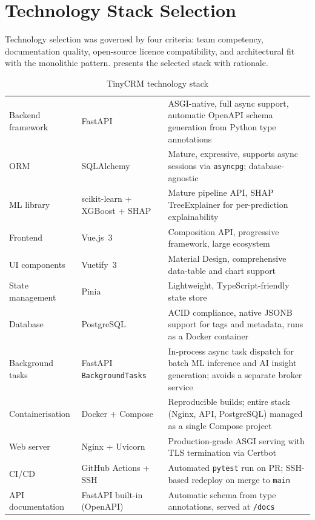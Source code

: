 \section{Technology Stack Selection}
 
Technology selection was governed by four criteria: team competency,
documentation quality, open-source licence compatibility, and architectural
fit with the monolithic pattern.  presents the selected
stack with rationale.
 
\begin{table}[H]
  \centering
  \caption{TinyCRM technology stack}
  \label{tab:techstack}
  \begin{tabularx}{\textwidth}{@{}L{2.8cm} L{2.6cm} X@{}}
    \toprule
     &  &  \\
    \midrule
    Backend framework & FastAPI &
      ASGI-native, full async support, automatic OpenAPI schema
      generation from Python type annotations \\
    ORM & SQLAlchemy &
      Mature, expressive, supports async sessions via \texttt{asyncpg};
      database-agnostic \\
    ML library & scikit-learn + XGBoost + SHAP &
      Mature pipeline API, SHAP TreeExplainer for per-prediction
      explainability \\
    Frontend & Vue.js~3 &
      Composition API, progressive framework, large ecosystem \\
    UI components & Vuetify~3 &
      Material Design, comprehensive data-table and chart support \\
    State management & Pinia &
      Lightweight, TypeScript-friendly state store \\
    Database & PostgreSQL &
      ACID compliance, native JSONB support for tags and metadata,
      runs as a Docker container \\
    Background tasks & FastAPI \texttt{BackgroundTasks} &
      In-process async task dispatch for batch ML inference and
      AI insight generation; avoids a separate broker service \\
    Containerisation & Docker + Compose &
      Reproducible builds; entire stack (Nginx, API, PostgreSQL)
      managed as a single Compose project \\
    Web server & Nginx + Uvicorn &
      Production-grade ASGI serving with TLS termination via Certbot \\
    CI/CD & GitHub Actions + SSH &
      Automated \texttt{pytest} run on PR; SSH-based redeploy on
      merge to \texttt{main} \\
    API documentation & FastAPI built-in (OpenAPI) &
      Automatic schema from type annotations, served at \texttt{/docs} \\
    \bottomrule
  \end{tabularx}
\end{table}
 
